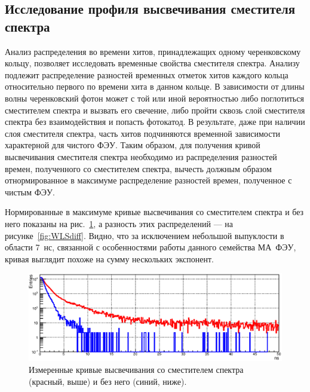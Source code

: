 \subsection{Исследование профиля высвечивания сместителя спектра}\label{section:secWLS}

Анализ распределения во времени хитов, принадлежащих одному черенковскому кольцу, позволяет исследовать временные свойства сместителя спектра. Анализу подлежит распределение разностей временных отметок хитов каждого кольца относительно первого по времени хита в данном кольце. В зависимости от длины волны черенковский фотон может с той или иной вероятностью либо поглотиться сместителем спектра и вызвать его свечение, либо пройти сквозь слой сместителя спектра без взаимодействия и попасть фотокатод. В результате, даже при наличии слоя сместителя спектра, часть хитов подчиняются временной зависимости характерной для чистого ФЭУ.
Таким образом, для получения кривой высвечивания сместителя спектра необходимо из распределения разностей времен, полученного со сместителем спектра, вычесть должным образом отнормированное в максимуме распределение разностей времен, полученное с чистым ФЭУ.

Нормированные в максимуме кривые высвечивания со сместителем спектра и без него показаны на рис.~\ref{fig:WLStwoCurves}, а разность этих распределений --- на рисунке~\ref{fig:WLSdiff}. Видно, что за исключением небольшой выпуклости в области 7~нс, связанной с особенностями работы данного семейства МА~ФЭУ, кривая выглядит похоже на сумму нескольких экспонент.

\begin{figure}
\includegraphics[width=1.0\textwidth]{pictures/WLS.eps}
\caption{Измеренные кривые высвечивания со сместителем спектра (красный, выше) и без него (синий, ниже).}
\label{fig:WLStwoCurves}
\end{figure}

